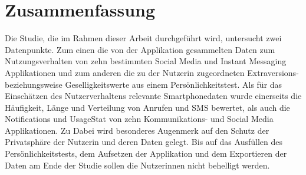 \section{Zusammenfassung}
\label{ch:Entwurf:sec:zusammenfassung}

Die Studie, die im Rahmen dieser Arbeit durchgeführt wird, untersucht zwei Datenpunkte.
Zum einen die von der Applikation gesammelten Daten zum Nutzungsverhalten von zehn bestimmten Social Media und Instant Messaging Applikationen
und zum anderen die zu der Nutzerin zugeordneten Extraversions- beziehungsweise Geselligkeitswerte aus einem Persönlichkeitstest.
Als für das Einschätzen des Nutzerverhaltens relevante Smartphonedaten wurde einerseits die Häufigkeit, Länge und Verteilung von  Anrufen und SMS bewertet,
als auch die Notifications und UsageStat von zehn Kommunikations- und Social Media Applikationen.
Zu 
Dabei wird besonderes Augenmerk auf den Schutz der Privatsphäre der Nutzerin und deren Daten gelegt.
Bis auf das Ausfüllen des Persönlichkeitstests, dem Aufsetzen der Applikation und dem Exportieren der Daten am Ende der Studie sollen die Nutzerinnen nicht behelligt werden.


